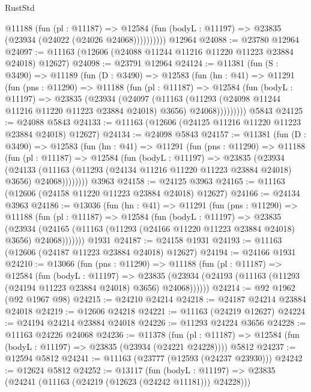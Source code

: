 \begin{lexlean}{RustStd}
\begin{coremodule}
            @11188
              (fun (pl : @11187) =>
              @12584 (fun (bodyL : @11197) => @23835 (@23934 (@24022 (@24026 @24068))))))))))
    @12964
@24088 := @23780 @12964
@24097 := @11163 (@12606 (@24088 @11244 @11216 @11220 @11223 @23884 @24018) @12627)
@24098 := @23791 @12964
@24124 := @11381
    (fun (S : @3490) =>
    @11189
      (fun (D : @3490) =>
      @12583
        (fun (hn : @41) =>
        @11291
          (fun (pns : @11290) =>
          @11188
            (fun (pl : @11187) =>
            @12584
              (fun (bodyL : @11197) =>
              @23835
                (@23934
                  (@24097
                    (@11163
                      (@11293 (@24098 @11244 @11216 @11220 @11223 @23884 @24018) @3656)
                      @24068)))))))))
    @5843
@24125 := @24088 @5843
@24133 := @11163 (@12606 (@24125 @11216 @11220 @11223 @23884 @24018) @12627)
@24134 := @24098 @5843
@24157 := @11381
    (fun (D : @3490) =>
    @12583
      (fun (hn : @41) =>
      @11291
        (fun (pns : @11290) =>
        @11188
          (fun (pl : @11187) =>
          @12584
            (fun (bodyL : @11197) =>
            @23835
              (@23934
                (@24133
                  (@11163 (@11293 (@24134 @11216 @11220 @11223 @23884 @24018) @3656) @24068))))))))
    @3963
@24158 := @24125 @3963
@24165 := @11163 (@12606 (@24158 @11220 @11223 @23884 @24018) @12627)
@24166 := @24134 @3963
@24186 := @13036
    (fun (hn : @41) =>
    @11291
      (fun (pns : @11290) =>
      @11188
        (fun (pl : @11187) =>
        @12584
          (fun (bodyL : @11197) =>
          @23835
            (@23934
              (@24165 (@11163 (@11293 (@24166 @11220 @11223 @23884 @24018) @3656) @24068)))))))
    @1931
@24187 := @24158 @1931
@24193 := @11163 (@12606 (@24187 @11223 @23884 @24018) @12627)
@24194 := @24166 @1931
@24210 := @13066
    (fun (pns : @11290) =>
    @11188
      (fun (pl : @11187) =>
      @12584
        (fun (bodyL : @11197) =>
        @23835 (@23934 (@24193 (@11163 (@11293 (@24194 @11223 @23884 @24018) @3656) @24068))))))
@24214 := @92 @1962 (@92 @1967 @98)
@24215 := @24210 @24214
@24218 := @24187 @24214 @23884 @24018
@24219 := @12606 @24218
@24221 := @11163 (@24219 @12627)
@24224 := @24194 @24214 @23884 @24018
@24226 := @11293 @24224 @3656
@24228 := @11163 @24226 @24068
@24236 := @11378
    (fun (pl : @11187) => @12584 (fun (bodyL : @11197) => @23835 (@23934 (@24221 @24228))))
    @5812
@24237 := @12594 @5812
@24241 := @11163 (@23777 (@12593 (@24237 @23930)))
@24242 := @12624 @5812
@24252 := @13117
    (fun (bodyL : @11197) => @23835 (@24241 (@11163 (@24219 (@12623 (@24242 @11181))) @24228)))

\end{coremodule}
\end{lexlean}
